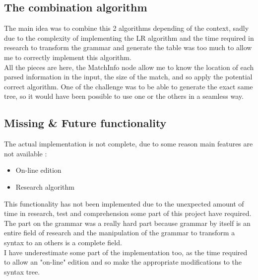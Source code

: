 \subsection{The combination algorithm}
The main idea was to combine this 2 algorithms depending of the context, sadly due to the complexity of implementing the LR algorithm and the time required in research to transform the grammar and generate the table was too much to allow me to correctly implement this algorithm.\\
All the pieces are here, the MatchInfo node allow me to know the location of each parsed information in the input, the size of the match, and so apply the potential correct algorithm. One of the challenge was to be able to generate the exact same tree, so it would have been possible to use one or the others in a seamless way.\\

\subsection{Missing \& Future functionality}
The actual implementation is not complete, due to some reason main features are not available :
\begin{itemize}
\item On-line edition
\item Research algorithm
\end{itemize}
This functionality has not been implemented due to the unexpected amount of time in research, test and comprehension some part of this project have required. The part on the grammar was a really hard part because grammar by itself is an entire field of research and the manipulation of the grammar to transform a syntax to an others is a complete field.\\
I have underestimate some part of the implementation too, as the time required to allow an "on-line" edition and so make the appropriate modifications to the syntax tree.